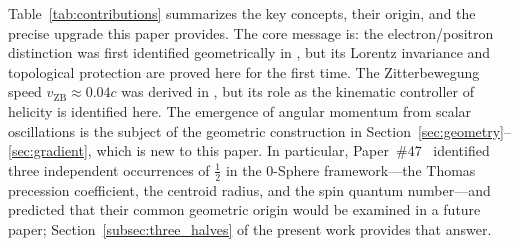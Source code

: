 \documentclass[%
 reprint, amsmath,amssymb, aps, prb, ]{revtex4-2}
\numberwithin{equation}{section}
\begin{document}
Table~\ref{tab:contributions} summarizes the key concepts, their origin, and the precise upgrade this paper provides.
The core message is: the electron/positron distinction was first identified geometrically in \cite{hanamura07}, but its Lorentz invariance and topological protection are proved here for the first time.
The Zitterbewegung speed $v_\mathrm{ZB} \approx 0.04c$ was derived in \cite{hanamura10}, but its role as the kinematic controller of helicity is identified here.
The emergence of angular momentum from scalar oscillations is the subject of the geometric construction in Section~\ref{sec:geometry}--\ref{sec:gradient}, which is new to this paper.
In particular, Paper~\#47~\cite{hanamura47} identified three independent occurrences of $\tfrac{1}{2}$ in the 0-Sphere framework---the Thomas precession coefficient, the centroid radius, and the spin quantum number---and predicted that their common geometric origin would be examined in a future paper; Section~\ref{subsec:three_halves} of the present work provides that answer.
\end{document}
